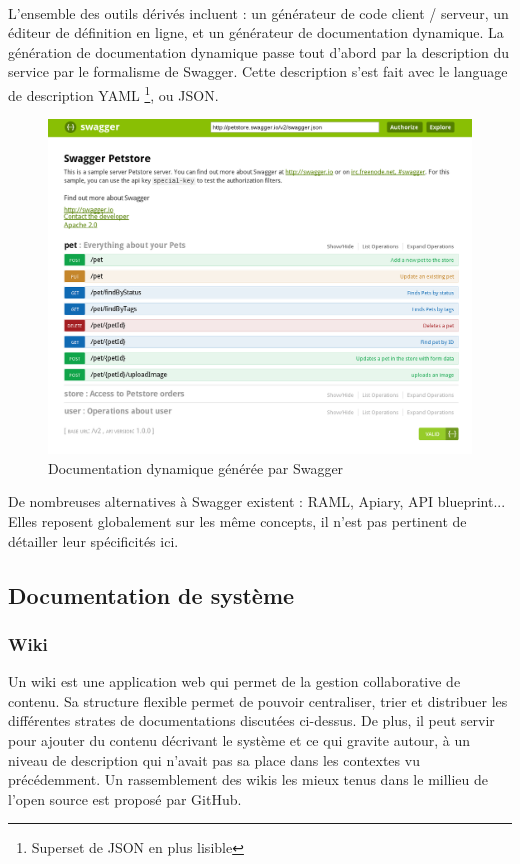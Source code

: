         \paragraph{}
            L'ensemble des outils dérivés incluent : un générateur de code client / serveur, un éditeur
            de définition en ligne, et un générateur de documentation dynamique.
            La génération de documentation dynamique passe tout d'abord par la description du service
            par le formalisme de Swagger. Cette description s'est fait avec le language de description YAML
            \footnote{Superset de JSON en plus lisible}, ou JSON.

        \begin{figure}[ht]
            \centering
            \includegraphics[scale=0.4]{./assets/swagger.png}
            \caption{Documentation dynamique générée par Swagger}
        \end{figure}

    De nombreuses alternatives à Swagger existent : RAML, Apiary, API blueprint... Elles reposent
    globalement sur les même concepts, il n'est pas pertinent de détailler leur spécificités ici.

\newpage
\subsection{Documentation de système}
    \subsubsection{Wiki}
        Un wiki est une application web qui permet de la gestion collaborative de contenu.
        Sa structure flexible permet de pouvoir centraliser, trier et distribuer les différentes strates
        de documentations discutées ci-dessus. De plus, il peut servir pour ajouter du contenu décrivant
        le système et ce qui gravite autour, à un niveau de description qui n'avait pas sa place dans les
        contextes vu précédemment. Un rassemblement des wikis les mieux tenus dans le millieu de l'open source
        est proposé par GitHub\cite{wiki}.

